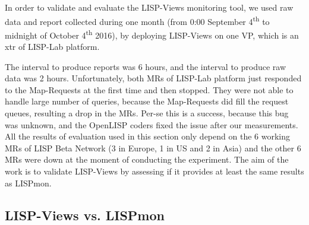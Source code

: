 In order to validate and evaluate the LISP-Views monitoring tool, we used raw data and report collected during one month (from 0:00 September 4\textsuperscript{th} to midnight of October 4\textsuperscript{th} 2016), by deploying LISP-Views on one VP, which is an \acrshort{xtr} of LISP-Lab platform.

The interval to produce reports was 6 hours, and the interval to produce raw data was 2 hours. Unfortunately, both MRs of LISP-Lab platform just responded to the Map-Requests at the first time and then stopped. They were not able to handle large number of queries, because the Map-Requests did fill the request queues, %
resulting a drop in the MRs.  Per-se this is a success, because this bug was unknown, and the OpenLISP coders fixed the issue after our measurements.  All the results of evaluation used in this section only depend on the 6 working MRs of LISP Beta Network (3 in Europe, 1 in US and 2 in Asia) and the other 6 MRs were down at the moment of conducting the experiment. The aim of the work is to validate LISP-Views by assessing if it provides at least the same results as LISPmon.


\subsection{LISP-Views vs. LISPmon}
\label{sec:lispviews_evaluation_com}

